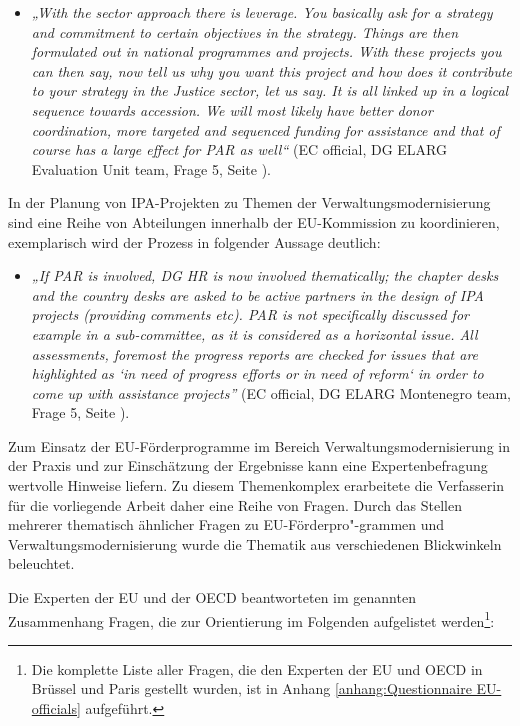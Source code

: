 \begin{itemize}[label={}]
\item \textit{„With the sector approach there is leverage. You basically ask for a strategy and commitment to certain objectives in the strategy. Things are then formulated out in national programmes and projects. With these projects you can then say, now tell us why you want this project and how does it contribute to your strategy in the Justice sector, let us say. It is all linked up in a logical sequence towards accession. We will most likely have better donor coordination, more targeted and sequenced funding for assistance and that of course has a large effect for PAR as well“} (EC official, DG ELARG Evaluation Unit team, Frage 5, Seite \pageref{sec:admin}).
\end{itemize}
In der Planung von IPA-Projekten zu Themen der Verwaltungsmodernisierung sind eine Reihe von Abteilungen innerhalb der EU-Kommission zu koordinieren, exemplarisch wird der Prozess in folgender Aussage deutlich:
\begin{itemize}[label={}]
\item \textit{„If PAR is involved, DG HR is now involved thematically; the chapter desks and the country desks are asked to be active partners in the design of IPA projects (providing comments etc). PAR is not specifically discussed for example in a sub-committee, as it is considered as a horizontal issue. All assessments, foremost the progress reports are checked for issues that are highlighted as `in need of progress efforts or in need of reform` in order to come up with assistance projects”} (EC official, DG ELARG Montenegro team, Frage 5, Seite \pageref{sec:admin}).
\end{itemize}
Zum Einsatz der EU-Förderprogramme im Bereich Verwaltungsmodernisierung in der Praxis und zur Einschätzung der Ergebnisse kann eine Expertenbefragung wertvolle Hinweise liefern. Zu diesem Themenkomplex erarbeitete die Verfasserin für die vorliegende Arbeit daher eine Reihe von Fragen. Durch das Stellen mehrerer thematisch ähnlicher Fragen zu EU-Förderpro"-grammen und Verwaltungsmodernisierung wurde die Thematik aus verschiedenen Blickwinkeln beleuchtet.\par
Die Experten der EU und der OECD beantworteten im genannten Zusammenhang Fragen, die zur Orientierung im Folgenden aufgelistet werden\footnote{Die komplette Liste aller Fragen, die den Experten der EU und OECD in Brüssel und Paris gestellt wurden, ist in Anhang \ref{anhang:Questionnaire EU-officials} aufgeführt.}:
